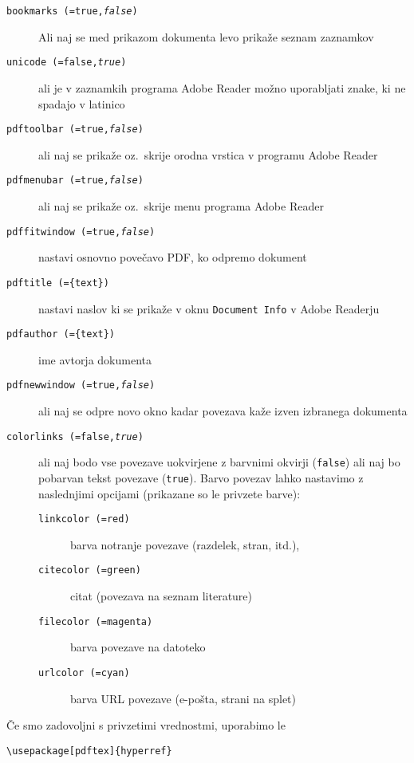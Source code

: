 \begin{flushleft}
\begin{description}
  \item [\texttt{bookmarks (=true,\textit{false})}] Ali naj se med prikazom
dokumenta levo prikaže seznam zaznamkov
  \item [\texttt{unicode (=false,\textit{true})}] ali je v 
zaznamkih programa Adobe Reader možno uporabljati znake, ki ne spadajo v latinico
  \item [\texttt{pdftoolbar (=true,\textit{false})}] ali naj se prikaže oz.~skrije orodna vrstica v programu Adobe Reader
  \item [\texttt{pdfmenubar (=true,\textit{false})}] ali naj se prikaže oz.~skrije menu programa Adobe Reader
  \item [\texttt{pdffitwindow (=true,\textit{false})}] nastavi 
osnovno povečavo PDF, ko odpremo dokument
  \item [\texttt{pdftitle (=\{text\})}] nastavi naslov ki se prikaže v oknu \texttt{Document Info} v  Adobe Readerju
  \item [\texttt{pdfauthor (=\{text\})}] ime avtorja dokumenta
  \item [\texttt{pdfnewwindow (=true,\textit{false})}] ali naj se odpre
novo okno kadar povezava kaže izven izbranega dokumenta
  \item [\texttt{colorlinks (=false,\textit{true})}] ali naj bodo vse 
povezave uokvirjene z barvnimi okvirji (\texttt{false}) ali naj bo
pobarvan tekst povezave 
    (\texttt{true}). Barvo povezav lahko nastavimo z naslednjimi
opcijami (prikazane so le privzete barve):
    \begin{description}
    \item [\texttt{linkcolor (=red)}] barva notranje povezave
      (razdelek, stran, itd.),
    \item [\texttt{citecolor (=green)}] citat (povezava na 
      seznam literature)
    \item [\texttt{filecolor (=magenta)}] barva povezave na datoteko
     \item [\texttt{urlcolor (=cyan)}] barva URL
      povezave (e-pošta, strani na splet)
    \end{description}
\end{description}
\end{flushleft}

Če smo zadovoljni s privzetimi vrednostmi, uporabimo le 
\begin{code}
\begin{verbatim}
\usepackage[pdftex]{hyperref}
\end{verbatim}
\end{code}

